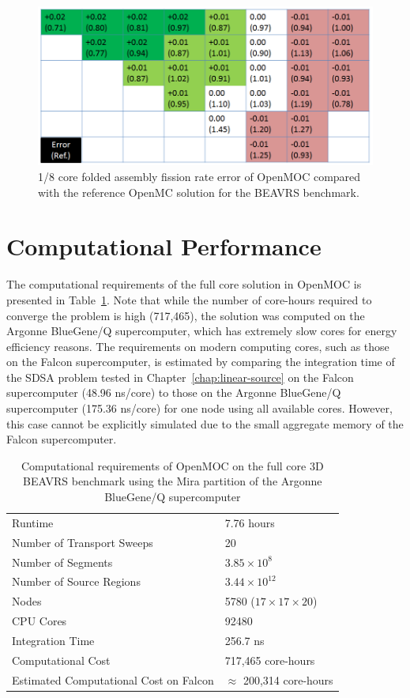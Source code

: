 \begin{figure}[ht!]
	\centering
	\includegraphics[width=\linewidth]{figures/results/full-core/folded-1-8-core-assembly-rr.png}
	\caption{1/8 core folded assembly fission rate error of OpenMOC compared with the reference OpenMC solution for the BEAVRS benchmark.}
	\label{fig:assembly-rr}
\end{figure}

\section{Computational Performance}
\label{sec:fc-computational-performance}

The computational requirements of the full core solution in OpenMOC is presented in Table~\ref{tab:full-core-comp-req}. Note that while the number of core-hours required to converge the problem is high (717,465), the solution was computed on the Argonne BlueGene/Q supercomputer, which has extremely slow cores for energy efficiency reasons. The requirements on modern computing cores, such as those on the Falcon supercomputer, is estimated by comparing the integration time of the SDSA problem tested in Chapter~\ref{chap:linear-source} on the Falcon supercomputer (48.96 ns/core) to those on the Argonne BlueGene/Q supercomputer (175.36 ns/core) for one node using all available cores. However, this case cannot be explicitly simulated due to the small aggregate memory of the Falcon supercomputer.

\begin{table}[ht]
	\centering
	\caption{Computational requirements of OpenMOC on the full core 3D BEAVRS benchmark using the Mira partition of the Argonne BlueGene/Q supercomputer}
	\medskip
	\begin{tabular}{l|l}
		\hline
		Runtime & 7.76 hours \\
		Number of Transport Sweeps & 20 \\
		Number of Segments & $3.85 \times 10^8$ \\
		Number of Source Regions & $3.44 \times 10^{12}$\\
		Nodes & 5780 ($17 \times 17 \times 20$) \\
		CPU Cores & 92480 \\
		Integration Time & 256.7 ns \\
		Computational Cost & 717,465 core-hours \\
		Estimated Computational Cost on Falcon & $\approx$ 200,314 core-hours \\
		\hline
	\end{tabular}
	\label{tab:full-core-comp-req}
\end{table}

